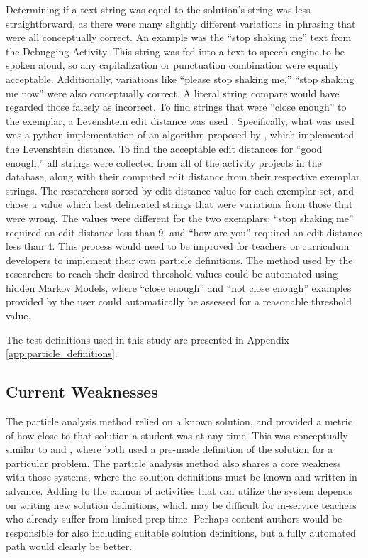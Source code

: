 \label{sec:close-enough-text} %
Determining if a text string was equal to the solution's string was less straightforward, as there were many slightly different variations in phrasing that were all conceptually correct. An example was the ``stop shaking me'' text from the Debugging Activity. This string was fed into a text to speech engine to be spoken aloud, so any capitalization or punctuation combination were equally acceptable. Additionally, variations like ``please stop shaking me,'' ``stop shaking me now'' were also conceptually correct. A literal string compare would have regarded those falsely as incorrect. To find strings that were ``close enough'' to the exemplar, a Levenshtein edit distance was used \citep{levenshtein1966binary}. Specifically, what was used was a python implementation of an algorithm proposed by \citet{hyyro2001explaining}, which implemented the Levenshtein distance. To find the acceptable edit distances for ``good enough,'' all strings were collected from all of the activity projects in the database, along with their computed edit distance from their respective exemplar strings. The researchers sorted by edit distance value for each exemplar set, and chose a value which best delineated strings that were variations from those that were wrong. The values were different for the two exemplars: ``stop shaking me'' required an edit distance less than 9, and ``how are you'' required an edit distance less than 4. This process would need to be improved for teachers or curriculum developers to implement their own particle definitions. The method used by the researchers to reach their desired threshold values could be automated using hidden Markov Models, where ``close enough'' and ``not close enough'' examples provided by the user could automatically be assessed for a reasonable threshold value.

The test definitions used in this study are presented in Appendix \ref{app:particle_definitions}. 

\subsection{Current Weaknesses}
The particle analysis method relied on a known solution, and provided a metric of how close to that solution a student was at any time. This was conceptually similar to \citet{le2007using} and \citet{mitrovic2003intelligent}, where both used a pre-made definition of the solution for a particular problem. The particle analysis method also shares a core weakness with those systems, where the solution definitions must be known and written in advance. Adding to the cannon of activities that can utilize the system depends on writing new solution definitions, which may be difficult for in-service teachers who already suffer from limited prep time. Perhaps content authors would be responsible for also including suitable solution definitions, but a fully automated path would clearly be better.

